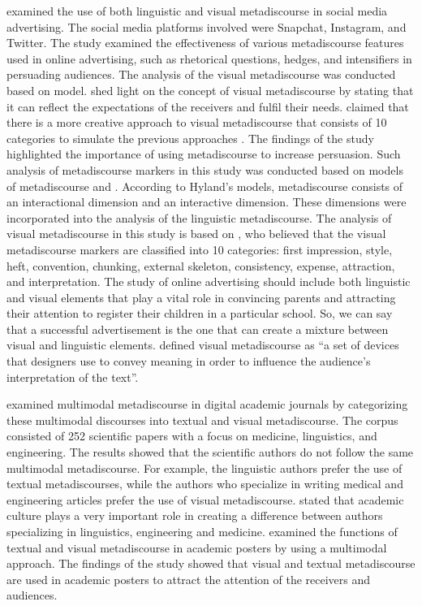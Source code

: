 \documentclass[english]{textolivre}
\begin{document}
\textcite{al-subhi_metadiscourse_2022} examined the use of both linguistic and visual metadiscourse in social media advertising. The social media platforms involved were Snapchat, Instagram, and Twitter. The study examined the effectiveness of various metadiscourse features used in online advertising, such as rhetorical questions, hedges, and intensifiers in persuading audiences. The analysis of the visual metadiscourse was conducted based on  model. \textcite{kumpf_visual_2000} shed light on the concept of visual metadiscourse by stating that it can reflect the expectations of the receivers and fulfil their needs. \textcite{kumpf_visual_2000} claimed that there is a more creative approach to visual metadiscourse that consists of 10 categories to simulate the previous approaches \cite{crismore_talking_1989,hyland_metadiscourse:_2005,kopple_exploratory_1985,Hyland_2019}. The findings of the study highlighted the importance of using metadiscourse to increase persuasion. Such analysis of metadiscourse markers in this study was conducted based on  models of metadiscourse and . According to Hyland’s models, metadiscourse consists of an interactional dimension and an interactive dimension. These dimensions were incorporated into the analysis of the linguistic metadiscourse. The analysis of visual metadiscourse in this study is based on , who believed that the visual metadiscourse markers are classified into 10 categories: first impression, style, heft, convention, chunking, external skeleton, consistency, expense, attraction, and interpretation. The study of online advertising should include both linguistic and visual elements that play a vital role in convincing parents and attracting their attention to register their children in a particular school. So, we can say that a successful advertisement is the one that can create a mixture between visual and linguistic elements. \textcite[p.~165]{de_groot_picture_2016} defined visual metadiscourse as “a set of devices that designers use to convey meaning in order to influence the audience’s interpretation of the text”. 

\textcite{carrio-pastor_multimodal_2021} examined multimodal metadiscourse in digital academic journals by categorizing these multimodal discourses into textual and visual metadiscourse. The corpus consisted of 252 scientific papers with a focus on medicine, linguistics, and engineering. The results showed that the scientific authors do not follow the same multimodal metadiscourse. For example, the linguistic authors prefer the use of textual metadiscourses, while the authors who specialize in writing medical and engineering articles prefer the use of visual metadiscourse. \textcite{carrio-pastor_multimodal_2021} stated that academic culture plays a very important role in creating a difference between authors specializing in linguistics, engineering and medicine. \textcite{aguilar_metadiscourse_2017} examined the functions of textual and visual metadiscourse in academic posters by using a multimodal approach. The findings of the study showed that visual and textual metadiscourse are used in academic posters to attract the attention of the receivers and audiences.
        
\end{document}
